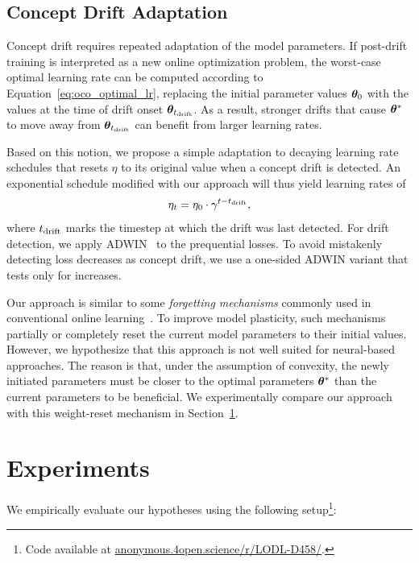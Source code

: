 \documentclass{article} %
\begin{document}
\subsection{Concept Drift Adaptation}

Concept drift requires repeated adaptation of the model parameters.
If post-drift training is interpreted as a new online optimization problem, the worst-case optimal learning rate can be computed according to Equation~\eqref{eq:oco_optimal_lr}, replacing the initial parameter values ${\bm{\theta}}_0$ with the values at the time of drift onset ${\bm{\theta}}_{t_{\rm{drift}}}$.
As a result, stronger drifts that cause ${\bm{\theta}}^*$ to move away from ${\bm{\theta}}_{t_{\rm{drift}}}$ can benefit from larger learning rates.

Based on this notion, we propose a simple adaptation to decaying learning rate schedules that resets $\eta$ to its original value when a concept drift is detected.
An exponential schedule modified with our approach will thus yield learning rates of
\begin{equation}
   \eta_t = \eta_0 \cdot \gamma^{t-t_{\rm{drift}}},
\end{equation}\label{eq:drift_reset}
where $t_{\rm{drift}}$ marks the timestep at which the drift was last detected.
For drift detection, we apply ADWIN~\citep{bifetLearningTimeChangingData2007} to the prequential losses.
To avoid mistakenly detecting loss decreases as concept drift, we use a one-sided ADWIN variant that tests only for increases.

Our approach is similar to some \textit{forgetting mechanisms} commonly used in conventional online learning~\citep{gamaSurveyConceptDrift2014}.
To improve model plasticity, such mechanisms partially or completely reset the current model parameters to their initial values.
However, we hypothesize that this approach is not well suited for neural-based approaches.
The reason is that, under the assumption of convexity, the newly initiated parameters must be closer to the optimal parameters ${\bm{\theta}}^*$ than the current parameters to be beneficial.
We experimentally compare our approach with this weight-reset mechanism in Section~\ref{sec:experiments}.

\section{Experiments}\label{sec:experiments}

We empirically evaluate our hypotheses using the following setup\footnote[2]{Code available at \url{anonymous.4open.science/r/LODL-D458/}.}:
\end{document}
